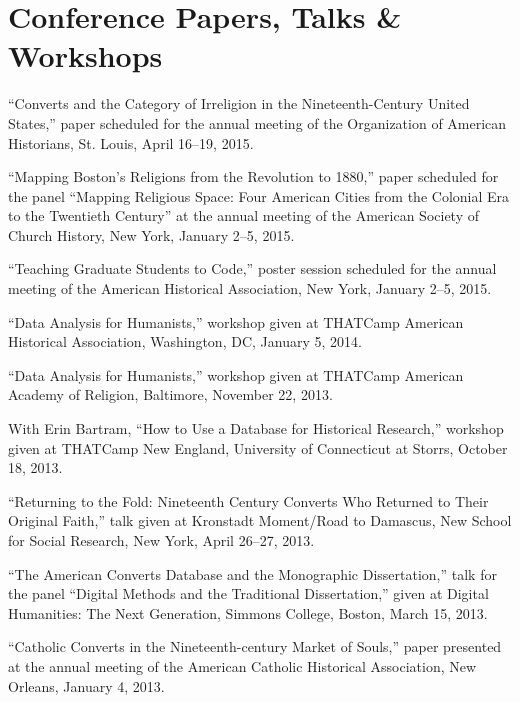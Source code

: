 \documentclass[11pt]{article}
\begin{document}


  \section{Conference Papers, Talks \& Workshops}

  ``Converts and the Category of Irreligion in the Nineteenth-Century United 
  States,'' paper scheduled for the annual meeting of the Organization of 
  American Historians, St. Louis, April 16--19, 2015.

  ``Mapping Boston's Religions from the Revolution to 1880,'' paper scheduled 
  for the panel ``Mapping Religious Space: Four American Cities from the 
  Colonial Era to the Twentieth Century''
  at the annual meeting of the American Society of Church History, New York, 
  January 2--5, 2015.

  ``Teaching Graduate Students to Code,'' poster session scheduled for the 
  annual meeting of the American Historical Association, New York, January 
  2--5, 2015.

  ``Data Analysis for Humanists,'' workshop given at THATCamp American 
  Historical Association, Washington, DC, January 5, 2014.

  ``Data Analysis for Humanists,'' workshop given at THATCamp American 
  Academy of Religion, Baltimore, November 22, 2013.

  With Erin Bartram, ``How to Use a Database for Historical
  Research,'' workshop given at THATCamp New England, University of 
  Connecticut at Storrs, October 18, 2013.

  ``Returning to the Fold: Nineteenth Century Converts Who Returned to
  Their Original Faith,'' talk given at Kronstadt Moment/Road to
  Damascus, New School for Social Research, New York, April 26--27, 2013.

  ``The American Converts Database and the Monographic Dissertation,''
  talk for the panel ``Digital Methods and the Traditional Dissertation,''
  given at Digital Humanities: The Next Generation, Simmons College,
  Boston, March 15, 2013.

  ``Catholic Converts in the Nineteenth-century Market of Souls,'' paper
  presented at the annual meeting of the American Catholic Historical
  Association, New Orleans, January 4, 2013.
\end{document}
